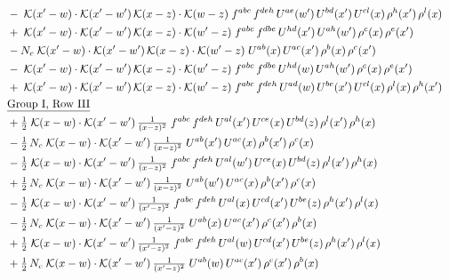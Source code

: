 \documentclass[9pt]{article}
\begin{document}
\begin{align}
&\quad -\;\mathcal{K}(x'-w)\cdot\mathcal{K}(x'-w')\,\mathcal{K}(x-z)\cdot\mathcal{K}(w-z)\;f^{abc}\,f^{deh}\,U^{ae}(w')\,U^{bd}(x')\,U^{cl}(x)\,\rho^{h}(x')\,\rho^{l}(x)\notag\\
&\quad +\;\mathcal{K}(x'-w)\cdot\mathcal{K}(x'-w')\,\mathcal{K}(x-z)\cdot\mathcal{K}(w'-z)\;f^{abc}\,f^{dbe}\,U^{hd}(x')\,U^{ah}(w')\,\rho^{c}(x)\,\rho^{e}(x')\notag\\
&\quad -N_c\;\mathcal{K}(x'-w)\cdot\mathcal{K}(x'-w')\,\mathcal{K}(x-z)\cdot\mathcal{K}(w'-z)\;U^{ab}(x)\,U^{ac}(x')\,\rho^{b}(x)\,\rho^{c}(x')\notag\\
&\quad -\;\mathcal{K}(x'-w)\cdot\mathcal{K}(x'-w')\,\mathcal{K}(x-z)\cdot\mathcal{K}(w'-z)\;f^{abc}\,f^{dbe}\,U^{hd}(w)\,U^{ah}(w')\,\rho^{c}(x)\,\rho^{e}(x')\notag\\
&\quad +\;\mathcal{K}(x'-w)\cdot\mathcal{K}(x'-w')\,\mathcal{K}(x-z)\cdot\mathcal{K}(w'-z)\;f^{abc}\,f^{deh}\,U^{ad}(w)\,U^{be}(x')\,U^{cl}(x)\,\rho^{l}(x)\,\rho^{h}(x')\notag\\
&\quad\underline{\text{Group I, Row III}}\notag\\
&\quad +\tfrac{1}{2}\;\mathcal{K}(x-w)\cdot\mathcal{K}(x'-w')\,\tfrac{1}{(x-z)^{2}}\;f^{abc}\,f^{deh}\,U^{al}(x')\,U^{ce}(x)\,U^{bd}(z)\,\rho^{l}(x')\,\rho^{h}(x)\notag\\
&\quad -\tfrac{1}{2}\,N_c\;\mathcal{K}(x-w)\cdot\mathcal{K}(x'-w')\,\tfrac{1}{(x-z)^{2}}\;U^{ab}(x')\,U^{ac}(x)\,\rho^{b}(x')\,\rho^{c}(x)\notag\\
&\quad -\tfrac{1}{2}\;\mathcal{K}(x-w)\cdot\mathcal{K}(x'-w')\,\tfrac{1}{(x-z)^{2}}\;f^{abc}\,f^{deh}\,U^{al}(w')\,U^{ce}(x)\,U^{bd}(z)\,\rho^{l}(x')\,\rho^{h}(x)\notag\\
&\quad +\tfrac{1}{2}\,N_c\;\mathcal{K}(x-w)\cdot\mathcal{K}(x'-w')\,\tfrac{1}{(x-z)^{2}}\;U^{ab}(w')\,U^{ac}(x)\,\rho^{b}(x')\,\rho^{c}(x)\notag\\
&\quad -\tfrac{1}{2}\;\mathcal{K}(x-w)\cdot\mathcal{K}(x'-w')\,\tfrac{1}{(x'-z)^{2}}\;f^{abc}\,f^{deh}\,U^{al}(x)\,U^{cd}(x')\,U^{be}(z)\,\rho^{h}(x')\,\rho^{l}(x)\notag\\
&\quad -\tfrac{1}{2}\,N_c\;\mathcal{K}(x-w)\cdot\mathcal{K}(x'-w')\,\tfrac{1}{(x'-z)^{2}}\;U^{ab}(x)\,U^{ac}(x')\,\rho^{c}(x')\,\rho^{b}(x)\notag\\
&\quad +\tfrac{1}{2}\;\mathcal{K}(x-w)\cdot\mathcal{K}(x'-w')\,\tfrac{1}{(x'-z)^{2}}\;f^{abc}\,f^{deh}\,U^{al}(w)\,U^{cd}(x')\,U^{be}(z)\,\rho^{h}(x')\,\rho^{l}(x)\notag\\
&\quad +\tfrac{1}{2}\,N_c\;\mathcal{K}(x-w)\cdot\mathcal{K}(x'-w')\,\tfrac{1}{(x'-z)^{2}}\;U^{ab}(w)\,U^{ac}(x')\,\rho^{c}(x')\,\rho^{b}(x)\notag\\

\end{align}
\end{document}
